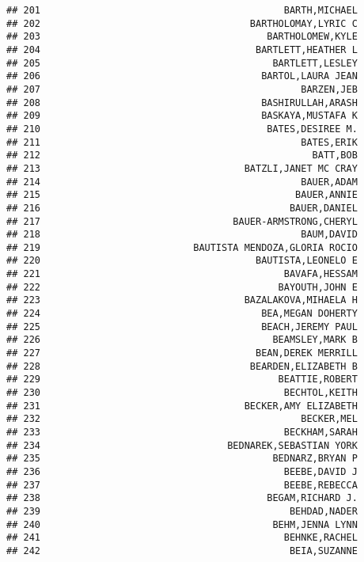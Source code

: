 \documentclass[
]{article}
\begin{document}
\begin{verbatim}
## 201                                           BARTH,MICHAEL
## 202                                     BARTHOLOMAY,LYRIC C
## 203                                        BARTHOLOMEW,KYLE
## 204                                      BARTLETT,HEATHER L
## 205                                         BARTLETT,LESLEY
## 206                                       BARTOL,LAURA JEAN
## 207                                              BARZEN,JEB
## 208                                       BASHIRULLAH,ARASH
## 209                                       BASKAYA,MUSTAFA K
## 210                                        BATES,DESIREE M.
## 211                                              BATES,ERIK
## 212                                                BATT,BOB
## 213                                    BATZLI,JANET MC CRAY
## 214                                              BAUER,ADAM
## 215                                             BAUER,ANNIE
## 216                                            BAUER,DANIEL
## 217                                  BAUER-ARMSTRONG,CHERYL
## 218                                              BAUM,DAVID
## 219                           BAUTISTA MENDOZA,GLORIA ROCIO
## 220                                      BAUTISTA,LEONELO E
## 221                                           BAVAFA,HESSAM
## 222                                          BAYOUTH,JOHN E
## 223                                    BAZALAKOVA,MIHAELA H
## 224                                       BEA,MEGAN DOHERTY
## 225                                       BEACH,JEREMY PAUL
## 226                                         BEAMSLEY,MARK B
## 227                                      BEAN,DEREK MERRILL
## 228                                     BEARDEN,ELIZABETH B
## 229                                          BEATTIE,ROBERT
## 230                                           BECHTOL,KEITH
## 231                                    BECKER,AMY ELIZABETH
## 232                                              BECKER,MEL
## 233                                           BECKHAM,SARAH
## 234                                 BEDNAREK,SEBASTIAN YORK
## 235                                         BEDNARZ,BRYAN P
## 236                                           BEEBE,DAVID J
## 237                                           BEEBE,REBECCA
## 238                                        BEGAM,RICHARD J.
## 239                                            BEHDAD,NADER
## 240                                         BEHM,JENNA LYNN
## 241                                           BEHNKE,RACHEL
## 242                                            BEIA,SUZANNE

\end{verbatim}
\end{document}
